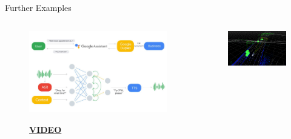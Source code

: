 \documentclass[main.tex]{subfiles}
\begin{document}
    \begin{frame}{Further Examples}
        \begin{columns}
            \begin{column}{.3\textwidth}
                \begin{figure}
                    \label{fig:google-duplex}
                    \includegraphics[width=\textwidth, cframe=gray]{figures/external/google-duplex.jpg}
                    
                    \tiny{\textbf{\href{https://www.youtube.com/watch?v=D5VN56jQMWM}{VIDEO}}}
                \end{figure}
            \end{column}
            \begin{column}{.3\textwidth}
                \begin{figure}
                    \label{fig:nivida}
                    \includegraphics[width=\textwidth, cframe=gray]{figures/external/nvidia.png}
                    

\end{figure}
\end{column}
\end{columns}
\end{frame}
\end{document}
